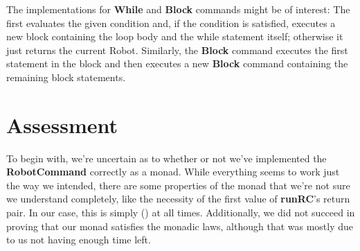 \documentclass[a4paper]{article}
\newcommand{\func}[1]{\textbf{\ttfamily #1}\xspace}
\begin{document}
The implementations for \func{While} and \func{Block} commands might be of interest: The first evaluates the given condition and, if the condition is satisfied, executes a new block containing the loop body and the while statement itself; otherwise it just returns the current Robot. Similarly, the \func{Block} command executes the first statement in the block and then executes a new \func{Block} command containing the remaining block statements.

\newpage
\section{Assessment}


To begin with, we're uncertain as to whether or not we've implemented the \func{RobotCommand} correctly as a monad. While everything seems to work just the way we intended, there are some properties of the monad that we're not sure we understand completely, like the necessity of the first value of \textbf{runRC}'s return pair. In our case, this is simply () at all times. Additionally, we did not succeed in proving that our monad satisfies the monadic laws, although that was mostly due to us not having enough time left. 
\end{document}
